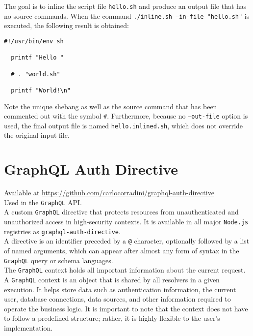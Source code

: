 The goal is to inline the script file \texttt{hello.sh} and produce an output
file that has no source commands. When the command \texttt{./inline.sh --in-file
"hello.sh"} is executed, the following result is obtained:

\begin{lstlisting}[language=shell, alsoletter={.}, morekeywords={[2]{.}}, xleftmargin=\parindent, caption=Inlined script \texttt{hello.inlined.sh}]
  #!/usr/bin/env sh

  printf "Hello "

  # . "world.sh"

  printf "World!\n"
\end{lstlisting}

Note the unique shebang as well as the source command that has been commented
out with the symbol \texttt{\#}. Furthermore, because no \texttt{--out-file}
option is used, the final output file is named \texttt{hello.inlined.sh}, which does
not override the original input file.

\section{GraphQL Auth Directive}
\label{sec:corollary_projects_graphql_auth_diretive}

Available at \url{https://github.com/carlocorradini/graphql-auth-directive} \\ %
Used in the \texttt{GraphQL} API. \\ %
A custom \texttt{GraphQL} directive that protects resources from unauthenticated
and unauthorized access in high-security contexts. It is available in all major
\texttt{Node.js} registries as \texttt{graphql-auth-directive}. \\ %
A directive is an identifier preceded by a \texttt{@} character, optionally
followed by a list of named arguments, which can appear after almost any form of
syntax in the \texttt{GraphQL} query or schema languages\cite{graphql_directive}.
\\ %
The \texttt{GraphQL} context holds all important information about the current
request. A \texttt{GraphQL} context is an object that is shared by all resolvers
in a given execution. It helps store data such as authentication information,
the current user, database connections, data sources, and other information required
to operate the business logic\cite{graphql_context}. It is important to note that
the context does not have to follow a predefined structure; rather, it is highly
flexible to the user's implementation.

